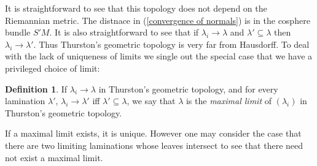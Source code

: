 \documentclass[reqno,11pt]{amsart}
\newcommand{\RR}{\mathbf{R}}
\DeclareMathOperator{\supp}{supp}
\newcommand{\Leaves}{\mathscr L}
\newcommand{\Hypspace}{\mathscr H}
\newcommand{\dfn}[1]{\emph{#1}\index{#1}}
\theoremstyle{definition}
\newtheorem{definition}[theorem]{Definition}
\numberwithin{equation}{section}
\begin{document}
%

It is straightforward to see that this topology does not depend on the Riemannian metric.
The distnace in (\ref{convergence of normals}) is in the cosphere bundle $S'M$.
It is also straightforward to see that if $\lambda_i \to \lambda$ and $\lambda' \subseteq \lambda$ then $\lambda_i \to \lambda'$.
Thus Thurston's geometric topology is very far from Hausdorff.
To deal with the lack of uniqueness of limits we single out the special case that we have a privileged choice of limit:

\begin{definition}
If $\lambda_i \to \lambda$ in Thurston's geometric topology, and for every lamination $\lambda'$, $\lambda_i \to \lambda'$ iff $\lambda' \subseteq \lambda$, we say that $\lambda$ is the \dfn{maximal limit} of $(\lambda_i)$ in Thurston's geometric topology.
\end{definition}

If a maximal limit exists, it is unique.
However one may consider the case that there are two limiting laminations whose leaves intersect to see that there need not exist a maximal limit.

\end{document}
